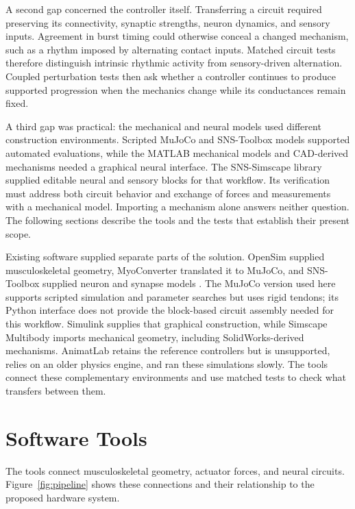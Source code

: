 A second gap concerned the controller itself. Transferring a circuit required preserving its connectivity, synaptic strengths, neuron dynamics, and sensory inputs. Agreement in burst timing could otherwise conceal a changed mechanism, such as a rhythm imposed by alternating contact inputs. Matched circuit tests therefore distinguish intrinsic rhythmic activity from sensory-driven alternation. Coupled perturbation tests then ask whether a controller continues to produce supported progression when the mechanics change while its conductances remain fixed.

A third gap was practical: the mechanical and neural models used different construction environments. Scripted MuJoCo and SNS-Toolbox models supported automated evaluations, while the MATLAB mechanical models and CAD-derived mechanisms needed a graphical neural interface. The SNS-Simscape library supplied editable neural and sensory blocks for that workflow. Its verification must address both circuit behavior and exchange of forces and measurements with a mechanical model. Importing a mechanism alone answers neither question. The following sections describe the tools and the tests that establish their present scope.

Existing software supplied separate parts of the solution. OpenSim supplied musculoskeletal geometry, MyoConverter translated it to MuJoCo, and SNS-Toolbox supplied neuron and synapse models \citep{delp_opensim_2007, caggiano_myosuite_2022, todorov_mujoco_2012, nourse_sns_2023}. The MuJoCo version used here supports scripted simulation and parameter searches but uses rigid tendons; its Python interface does not provide the block-based circuit assembly needed for this workflow. Simulink supplies that graphical construction, while Simscape Multibody imports mechanical geometry, including SolidWorks-derived mechanisms. AnimatLab retains the reference controllers but is unsupported, relies on an older physics engine, and ran these simulations slowly. The tools connect these complementary environments and use matched tests to check what transfers between them.

\section{Software Tools}\label{sec:preliminary_sim_methods}

The tools connect musculoskeletal geometry, actuator forces, and neural circuits. Figure~\ref{fig:pipeline} shows these connections and their relationship to the proposed hardware system.

